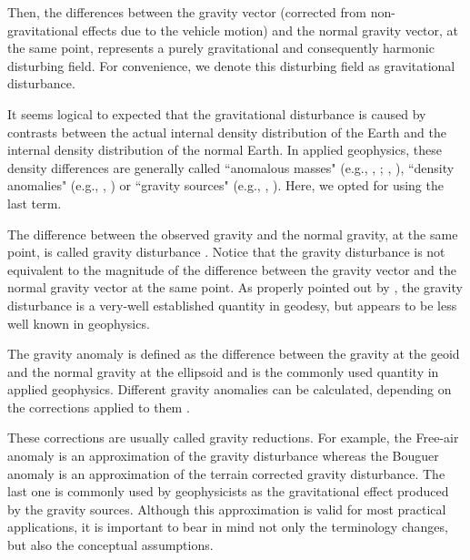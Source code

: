 \documentclass[manuscript]{geophysics}
\begin{document}
Then, the differences between the gravity vector
(corrected from non-gravitational effects due to the vehicle motion) 
and the normal gravity vector, at the same point, represents a purely 
gravitational and consequently harmonic disturbing field.
For convenience, we denote this disturbing field as
gravitational disturbance.


It seems logical to expected that the gravitational disturbance 
is caused by contrasts between the actual internal 
density distribution of the Earth and the internal density 
distribution of the normal Earth.
In applied geophysics, these density differences are generally 
called ``anomalous masses" (e.g., \citeauthor{hammer1945}, 
\citeyear{hammer1945}; \citeauthor{lafehr1965}, \citeyear{lafehr1965}),
``density anomalies" (e.g., \citeauthor{forsberg1984}, \citeyear{forsberg1984})
or ``gravity sources" (e.g., \citeauthor{blakely1996}, 
\citeyear{blakely1996}). Here, we opted for using the last term.


The difference between the observed gravity and the
normal gravity, at the same point, is called gravity disturbance
\citep{hofmann-wellenhof-moritz2005}.
Notice that the gravity disturbance is not equivalent to the
magnitude of the difference between the gravity vector
and the normal gravity vector at the same point.
As properly pointed out by \citet{hackney-featherstone2003},
the gravity disturbance is a very-well established quantity in geodesy,
but appears to be less well known in geophysics.


The gravity anomaly is defined as the difference
between the gravity at the geoid and the normal gravity at the ellipsoid
and is the commonly used quantity in applied geophysics.
Different gravity anomalies can be calculated, depending on the
corrections applied to them \citep{blakely1996, hofmann-wellenhof-moritz2005}.


These corrections are usually called gravity reductions.
For example, the Free-air anomaly is an approximation of the
gravity disturbance whereas the Bouguer anomaly
is an approximation of the terrain corrected gravity disturbance.
The last one is commonly used by geophysicists as the
gravitational effect produced by the gravity sources.
Although this approximation is valid for most practical applications,
it is important to bear in mind not only the terminology 
changes, but also the conceptual assumptions.
\end{document}
